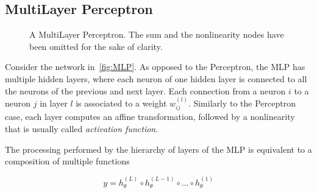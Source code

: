 \subsection{MultiLayer Perceptron}\label{sec:MLP}
\begin{figure}[h]
    \centering
    \begin{neuralnetwork} [nodespacing=7.5mm, layerspacing=23mm,
            maintitleheight=2.5em, layertitleheight=5em,
            height=3, toprow=true, nodesize=17pt,
            style={}, title={}, titlestyle={}]
        \hiddenlayer[count=3, bias=true, title=Layer 1, text=\nodetexthi]
        {\setdefaultlinklabel{\wijllink}\linklayers}
        \hiddenlayer[count=5, bias=true, title=Layer 2, text=\nodetexthi]
        {\setdefaultlinklabel{\wijllink}\linklayers}
        \hiddenlayer[count=4, bias=true, title=Layer 3, text=\nodetexthi]
        {\setdefaultlinklabel{\wijllink}\linklayers}
        \outputlayer[count=1, text=\nodetexty]
        {\setdefaultlinklabel{\wijllink}\linklayers}
    \end{neuralnetwork}
    \centering
    \caption{\label{fig:MLP}A MultiLayer Perceptron. The sum and the
        nonlinearity nodes have been omitted for the sake of clarity.
    }
\end{figure}

Consider the network in~\autoref{fig:MLP}. As opposed to the Perceptron, the
MLP has multiple hidden layers, where each neuron of one hidden layer is
connected to all the neurons of the previous and next layer. Each connection
from a neuron $i$ to a neuron $j$ in layer $l$ is associated to a weight
$w_{ij}^{(l)}$. Similarly to the Perceptron case, each layer computes an affine
transformation, followed by a nonlinearity that is usually called
\emph{activation function}.

The processing performed by the hierarchy of layers of the MLP is equivalent to
a composition of multiple functions

\begin{equation}\label{eq:fn_composition}
    y = h^{(L)}_{\theta} \circ h^{(L-1)}_{\theta} \circ \dots \circ
        h^{(1)}_{\theta}
\end{equation}

